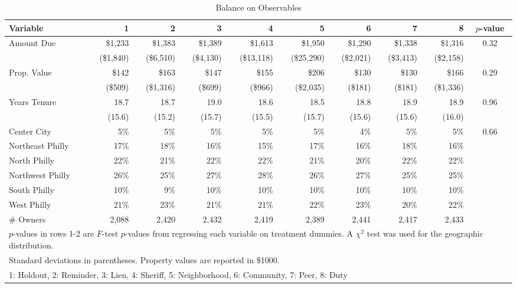 \begin{sidewaystable}[htbp]
\centering
\caption{Balance on Observables}
\label{balance}
\vspace{10mm}
\begin{tabular}{lrrrrrrrrc}
  \hline
Variable & 1 & 2 & 3 & 4 & 5 & 6 & 7 & 8 & $p$-value \\ 
   \hline
Amount Due & \$1,233 & \$1,383 & \$1,389 & \$1,613 & \$1,950 & \$1,290 & \$1,338 & \$1,316 & 0.32 \\ 
   & (\$1,840) & (\$6,510) & (\$4,130) & (\$13,118) & (\$25,290) & (\$2,021) & (\$3,413) & (\$2,158) &  \\ 
  Prop. Value & \$142 & \$163 & \$147 & \$155 & \$206 & \$130 & \$130 & \$166 & 0.29 \\ 
   & (\$509) & (\$1,316) & (\$699) & (\$966) & (\$2,035) & (\$181) & (\$181) & (\$1,336) &  \\ 
  Years Tenure & 18.7 & 18.7 & 19.0 & 18.6 & 18.5 & 18.8 & 18.9 & 18.9 & 0.96 \\ 
   & (15.6) & (15.2) & (15.7) & (15.5) & (15.7) & (15.6) & (15.6) & (16.0) &  \\ 
  Center City & 5\% & 5\% & 5\% & 5\% & 5\% & 4\% & 5\% & 5\% & 0.66 \\ 
  Northeast Philly & 17\% & 18\% & 16\% & 15\% & 17\% & 16\% & 18\% & 16\% &  \\ 
  North Philly & 22\% & 21\% & 22\% & 22\% & 21\% & 20\% & 22\% & 22\% &  \\ 
  Northwest Philly & 26\% & 25\% & 27\% & 28\% & 26\% & 27\% & 25\% & 25\% &  \\ 
  South Philly & 10\% &  9\% & 10\% & 10\% & 10\% & 10\% & 10\% & 10\% &  \\ 
  West Philly & 21\% & 23\% & 21\% & 21\% & 22\% & 23\% & 20\% & 22\% &  \\ 
  \# Owners & 2,088 & 2,420 & 2,432 & 2,419 & 2,389 & 2,441 & 2,417 & 2,433 &  \\ 
  \hline
\multicolumn{10}{l}{\scriptsize{$p$-values in rows 1-2 are $F$-test
    $p$-values from regressing each variable on treatment dummies. A
    $\chi^2$ test was used for the geographic distribution. }} \\
\multicolumn{10}{l}{\scriptsize{ Standard deviations in parentheses. Property values are reported in \$1000.  }} \\
\multicolumn{10}{l}{\scriptsize{1: Holdout, 2: Reminder, 3: Lien, 4: Sheriff, 5: Neighborhood, 6: Community, 7: Peer, 8: Duty}} \\
\end{tabular}
\end{sidewaystable}

